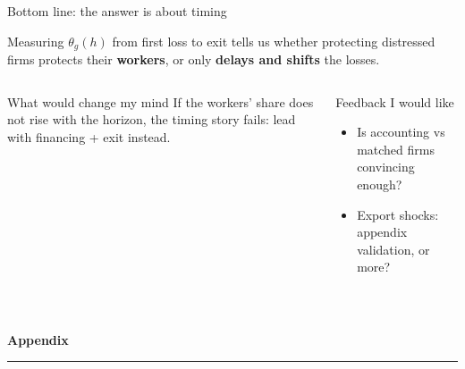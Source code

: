 \documentclass[aspectratio=169,11pt]{beamer}
\newlength{\safezone}
\newcommand{\hl}[1]{{\color{WarmAmber}\bfseries #1}}
\begin{document}
\begin{frame}[label=closing]{Bottom line: the answer is about timing}
  \begin{keybox}
    \large Measuring $\theta_g(h)$ from first loss to exit tells us whether protecting distressed
    firms protects their \textbf{workers}, or only \hl{delays and shifts} the losses.
  \end{keybox}
  \vspace{4pt}
  \begin{columns}[T,onlytextwidth]
    \begin{cardbox}{What would change my mind}
      If the workers' share does \alert{not} rise with the horizon, the timing story fails:
      lead with financing + exit instead.
    \end{cardbox}
    \begin{cardbox}{Feedback I would like}
      \begin{itemize}
        \item Is accounting vs matched firms convincing enough?
        \item Export shocks: appendix validation, or more?
      \end{itemize}
    \end{cardbox}
  \end{columns}
  \vfill
  \hfill\hyperlink{nextsteps}{}\,\hyperlink{contrib}{}\hspace{\safezone}
\end{frame}

\appendix
\begin{frame}[plain]
  \vfill
  \begin{center}
    {\Huge\bfseries\color{SlateTeal}Appendix\par}
    \vskip8pt
    {\color{WarmAmber}\rule{0.3\textwidth}{1.2pt}}
  \end{center}
  \vfill
\end{frame}
\end{document}
